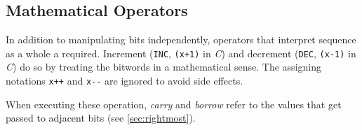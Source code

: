 \subsection*{Mathematical Operators}
In addition to manipulating bits independently,
operators that interpret sequence as a whole a required.
Increment (\lstinline$INC$, \lstinline$(x+1)$ in \emph{C})
and decrement (\lstinline$DEC$, \lstinline$(x-1)$ in \emph{C})
do so by treating the bitwords in a mathematical sense.
The assigning notations \lstinline$x++$ and \lstinline$x--$
are ignored to avoid side effects.

When executing these operation, \emph{carry} and \emph{borrow}
refer to the values that get passed to adjacent bits
(see \autoref{sec:rightmost}).
